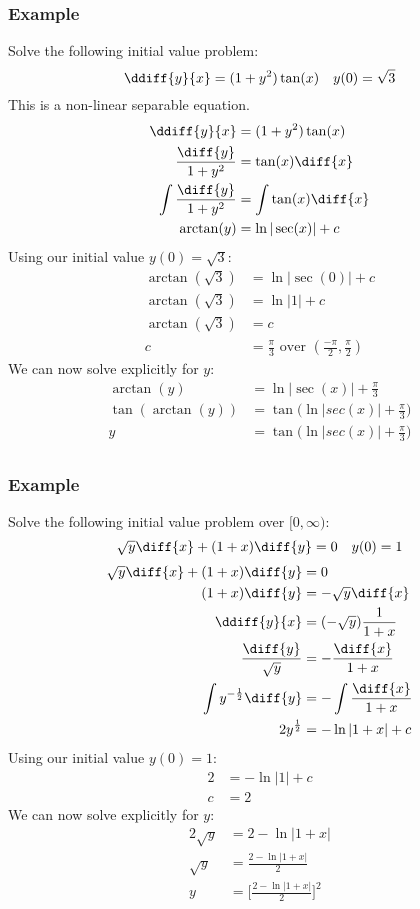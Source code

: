 \documentclass{math}
\begin{document}
\subsubsection*{Example}
Solve the following initial value problem:
\[ \ddiff{y}{x} = (1+y^2)\tan(x) \quad y(0) = \sqrt{3} \]
This is a non-linear separable equation.
\begin{align*}
  \ddiff{y}{x} &= (1+y^2)\tan(x) \\
  \frac{\diff{y}}{1+y^2} &= \tan(x)\diff{x} \\
  \int\frac{\diff{y}}{1+y^2} &= \int\tan(x)\diff{x} \\
  \arctan(y) &= \ln|\sec(x)|+c
\end{align*}
Using our initial value \( y(0) = \sqrt{3} \):
\begin{align*}
  \arctan(\sqrt{3}) &= \ln|\sec(0)|+c \\
  \arctan(\sqrt{3}) &= \ln|1|+c \\
  \arctan(\sqrt{3}) &= c \\
  c &= \frac{\pi}{3} \text{ over } \left(\frac{-\pi}{2},\frac{\pi}{2}\right)
\end{align*}
We can now solve explicitly for \( y \):
\begin{align*}
  \arctan(y) &= \ln|\sec(x)|+\frac{\pi}{3} \\
  \tan(\arctan(y)) &= \tan\bigg(\ln|sec(x)|+\frac{\pi}{3}\bigg) \\
  y &= \tan\bigg(\ln|sec(x)|+\frac{\pi}{3}\bigg) \\
\end{align*}

\subsubsection*{Example}
Solve the following initial value problem over \( [0,\infty) \):
\[ \sqrt{y}\diff{x}+(1+x)\diff{y} = 0 \quad y(0) = 1 \]
\begin{align*}
  \sqrt{y}\diff{x}+(1+x)\diff{y} &= 0 \\
  (1+x)\diff{y} &= -\sqrt{y}\diff{x} \\
  \ddiff{y}{x} &= (-\sqrt{y})\frac{1}{1+x} \\
  \frac{\diff{y}}{\sqrt{y}} &= -\frac{\diff{x}}{1+x} \\
  \int y^{-\frac{1}{2}}\diff{y} &= -\int\frac{\diff{x}}{1+x} \\
  2y^{\frac{1}{2}} &= -\ln|1+x|+c
\end{align*}
Using our initial value \( y(0) = 1 \):
\begin{align*}
  2 &= -\ln|1|+c \\
  c &= 2
\end{align*}
We can now solve explicitly for \( y \):
\begin{align*}
  2\sqrt{y} &= 2-\ln|1+x| \\
  \sqrt{y} &= \frac{2-\ln|1+x|}{2} \\
  y &= \bigg[\frac{2-\ln|1+x|}{2}\bigg]^2
\end{align*}
\end{document}
